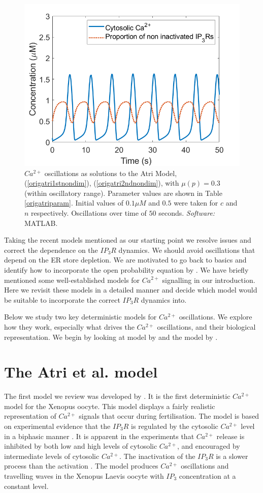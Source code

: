 \begin{figure}[h!!!t!!!b!!!p]
  \centering
  \includegraphics[width=0.6\linewidth]{Chapters/2_Ca2+_Models/extras/orginalatrimu1.png}
  \caption{$Ca^{2+}$ oscillations as solutions to the Atri Model, (\ref{origatri1stnondim}), (\ref{origatri2ndnondim}), with $\mu(p)=0.3$ (within oscillatory range). Parameter values are shown in Table \ref{origatriparam}. Initial values of $0.1\mu M$ and $0.5$ were taken for $c$ and $n$ respectively. Oscillations over time of $50$ seconds. \textit{Software:} MATLAB.}\label{figorigatri}
\end{figure}

Taking the recent models mentioned as our starting point we resolve issues and correct the dependence on the $IP_3R$ dynamics. We should avoid oscillations that depend on the ER store depletion. We are motivated to go back to basics and identify {how to incorporate} the open probability equation by . We have briefly mentioned some well-established models for $Ca^{2+}$ signalling in our introduction. Here we revisit these models in a detailed manner and decide which model would be suitable to incorporate the correct $IP_3R$ dynamics into.

Below we study two key deterministic models for $Ca^{2+}$ oscillations. We explore how they work, especially what drives the $Ca^{2+}$ oscillations, and their biological representation. We begin by looking at model by  and the model by .

\section{The Atri et al. model}

The first model we review was developed by . It is the first deterministic $Ca^{2+}$ model for the Xenopus oocyte. This model displays a fairly realistic representation of $Ca^{2+}$ signals that occur during fertilisation. The model is based on experimental evidence that the $IP_3R$ is regulated by the cytosolic $Ca^{2+}$ level in a biphasic manner . It is apparent in the experiments that $Ca^{2+}$ release is inhibited by both low and high levels of cytosolic $Ca^{2+}$, and encouraged by intermediate levels of cytosolic $Ca^{2+}$. The inactivation of the $IP_3R$ is a slower process than the activation . The model produces $Ca^{2+}$ oscillations and travelling waves in the Xenopus Laevis oocyte with $IP_3$ concentration at a constant level.

